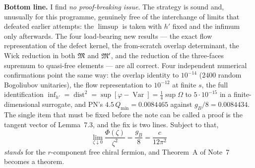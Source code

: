 \documentclass[11pt]{article}
\providecommand{\dist}{\operatorname{dist}}\providecommand{\Var}{\operatorname{Var}}
\begin{document}
\textbf{Bottom line.}  I find \emph{no proof-breaking issue}.  The strategy is sound and, unusually
for this programme, genuinely free of the interchange of limits that defeated earlier attempts: the
$\limsup$ is taken with $h'$ fixed and the infimum only afterwards.  The four load-bearing new
results --- the exact flow representation of the defect kernel, the from-scratch overlap determinant,
the Wick reduction in both $\mathfrak M$ and $\mathfrak M'$, and the reduction of the three-faces supremum to
quasi-free elements --- are all correct.  Four independent numerical confirmations point the same
way: the overlap identity to $10^{-14}$ ($2400$ random Bogoliubov unitaries), the flow
representation to $10^{-12}$ at finite $s$, the full identification
$\inf_{h'}=\dist^2=\sup[\varphi-\Var]=\frac14\sup\Omega$ to $5\cdot10^{-15}$ in a
finite-dimensional surrogate, and PN's $4.5\,Q_{\min}=0.0084465$ against $g_B/8=0.0084434$.  The single item that must be fixed before the
note can be called a proof is the tangent vector of Lemma~7.3, and the fix is two lines.  Subject to
that,
\[
 \boxed{\ \lim_{\zeta\downarrow0}\frac{\Phi(\zeta)}{\zeta^2}=\frac{g_B}8=\frac c{12\pi^2}\ }
\]
\emph{stands} for the $r$-component free chiral fermion, and Theorem~A of Note~7 becomes a theorem.
\end{document}
